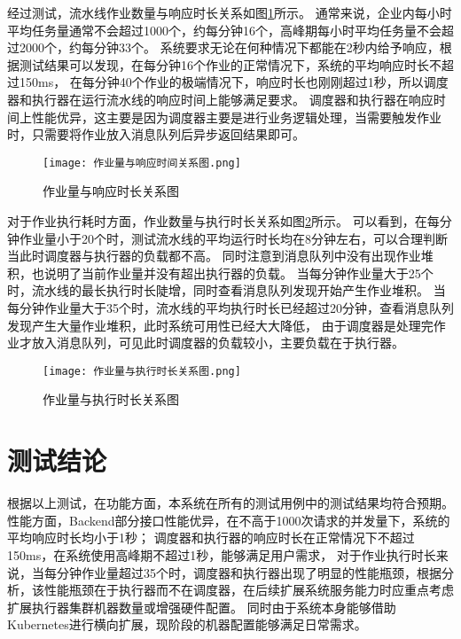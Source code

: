 经过测试，流水线作业数量与响应时长关系如图\ref{fig:作业量与响应时长关系图}所示。
通常来说，企业内每小时平均任务量通常不会超过1000个，约每分钟16个，高峰期每小时平均任务量不会超过2000个，约每分钟33个。
系统要求无论在何种情况下都能在2秒内给予响应，根据测试结果可以发现，在每分钟16个作业的正常情况下，系统的平均响应时长不超过150ms，
在每分钟40个作业的极端情况下，响应时长也刚刚超过1秒，所以调度器和执行器在运行流水线的响应时间上能够满足要求。
调度器和执行器在响应时间上性能优异，这主要是因为调度器主要是进行业务逻辑处理，当需要触发作业时，只需要将作业放入消息队列后异步返回结果即可。

\begin{figure}[h]
  \centering
  \texttt{[image: 作业量与响应时间关系图.png]}
  \caption{作业量与响应时长关系图}
  \label{fig:作业量与响应时长关系图}
\end{figure}

对于作业执行耗时方面，作业数量与执行时长关系如图\ref{fig:作业量与执行时长关系图}所示。
可以看到，在每分钟作业量小于20个时，测试流水线的平均运行时长均在8分钟左右，可以合理判断当此时调度器与执行器的负载都不高。
同时注意到消息队列中没有出现作业堆积，也说明了当前作业量并没有超出执行器的负载。
当每分钟作业量大于25个时，流水线的最长执行时长陡增，同时查看消息队列发现开始产生作业堆积。
当每分钟作业量大于35个时，流水线的平均执行时长已经超过20分钟，查看消息队列发现产生大量作业堆积，此时系统可用性已经大大降低，
由于调度器是处理完作业才放入消息队列，可见此时调度器的负载较小，主要负载在于执行器。

\begin{figure}[h]
  \centering
  \texttt{[image: 作业量与执行时长关系图.png]}
  \caption{作业量与执行时长关系图}
  \label{fig:作业量与执行时长关系图}
\end{figure}

\section{测试结论}

根据以上测试，在功能方面，本系统在所有的测试用例中的测试结果均符合预期。性能方面，Backend部分接口性能优异，在不高于1000次请求的并发量下，系统的平均响应时长均小于1秒；
调度器和执行器的响应时长在正常情况下不超过150ms，在系统使用高峰期不超过1秒，能够满足用户需求，
对于作业执行时长来说，当每分钟作业量超过35个时，调度器和执行器出现了明显的性能瓶颈，根据分析，该性能瓶颈在于执行器而不在调度器，在后续扩展系统服务能力时应重点考虑扩展执行器集群机器数量或增强硬件配置。
同时由于系统本身能够借助Kubernetes进行横向扩展，现阶段的机器配置能够满足日常需求。



